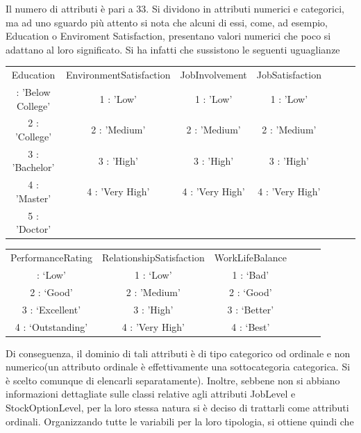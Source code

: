 \documentclass[english]{article}
\begin{document}
Il numero di attributi è pari a 33. Si dividono in attributi numerici e categorici, ma ad uno sguardo più attento si nota che alcuni di essi, come, ad esempio, Education o Enviroment Satisfaction, presentano valori numerici che poco si adattano al loro significato. Si ha infatti che sussistono le seguenti uguaglianze 

\begin{center}
\begin{tabular}{|c|c|c|c|c|c|c|}
\arrayrulecolor{white}\hline
Education & EnvironmentSatisfaction & JobInvolvement & JobSatisfaction \\
\arrayrulecolor{white}\hline
1 : 'Below College' & 1 : 'Low'  & 1 : 'Low'& 1 : 'Low' \\
2 : 'College'  & 2 : 'Medium' & 2 : 'Medium'& 2 : 'Medium'\\
3 : 'Bachelor'    &3 : 'High' & 3 : 'High'& 3 : 'High'  \\
4 : 'Master'    &4 : 'Very High' & 4 : 'Very High' & 4 : 'Very High' \\
5 : 'Doctor'  &  & &\\
\hline
\end{tabular}
\end{center}


\begin{center}
\begin{tabular}{|c|c|c|c|c|c|}
\arrayrulecolor{white}\hline
PerformanceRating & RelationshipSatisfaction&WorkLifeBalance  &   \quad\quad&\quad\quad    &\quad\quad      \\
\arrayrulecolor{white}\hline
1 : `Low' & 1 : `Low' & 1 : `Bad'&&&\\
2 : `Good' & 2 : 'Medium'& 2 : `Good'&&&\\
3 : `Excellent'& 3 : 'High' & 3 : `Better'&&&\\
4 : `Outstanding'& 4 : 'Very High' &4 : `Best'&&&\\
\hline
\end{tabular}
\end{center}


Di conseguenza, il dominio di tali attributi è di tipo categorico od ordinale e non numerico(un attributo ordinale è effettivamente una sottocategoria categorica. Si è scelto comunque di elencarli separatamente). Inoltre, sebbene non si abbiano informazioni dettagliate sulle classi relative agli attributi JobLevel e  StockOptionLevel, per la loro stessa natura si è deciso di trattarli come attributi ordinali. Organizzando tutte le variabili per la loro tipologia, si ottiene quindi che
\end{document}
